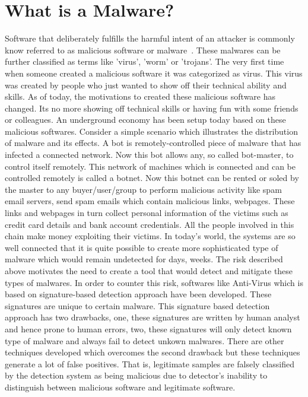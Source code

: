 \documentclass[11pt]{article}
\begin{document}
		\section{What is a Malware?}
	Software that deliberately fulfills the harmful intent of an attacker is commonly know referred to as malicious software or malware~\cite{moser2007exploring}. These malwares can be further classified as terms like 'virus', 'worm' or 'trojans'. The very first time when someone created a malicious software it was categorized as virus. This virus was created by people who just wanted to show off their technical ability and skills. As of today, the motivations to created these malicious software has changed. Its no more showing off technical skills or having fun with some friends or colleagues. An underground economy has been setup today based on these malicious softwares.
	Consider a simple scenario which illustrates the distribution of malware and its effects. A bot is remotely-controlled piece of malware that has infected a connected network. Now this bot allows any, so called bot-master, to control itself remotely. This network of machines which is connected and can be controlled remotely is called a botnet. Now this botnet can be rented or soled by the master to any buyer/user/group to perform malicious activity like spam email servers, send spam emails which contain malicious links, webpages.  These links and webpages in turn collect personal information of the victims such as credit card details and bank account credentials. All the people involved in this chain make money exploiting their victims. In today's world, the systems are so well connected that it is quite possible to create more sophisticated type of malware which would remain undetected for days, weeks.
	The risk described above motivates the need to create a tool that would detect and mitigate these types of malwares. In order to counter this risk, softwares like Anti-Virus which is based on signature-based detection approach have been developed. These signatures are unique to certain malware. This signature based detection approach has two drawbacks, one, these signatures are written by human analyst and hence prone to human errors, two, these signatures will only detect known type of malware and always fail to detect unkown malwares.
	There are other techniques developed which overcomes the second drawback but these techniques generate a lot of false positives. That is, legitimate samples are falsely classified by the detection system as being malicious due to detector's inability to distinguish between malicious software and legitimate software. 
\end{document}
